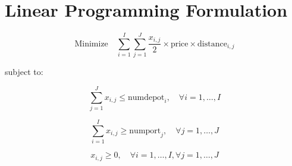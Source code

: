\documentclass{article}
\begin{document}
\section*{Linear Programming Formulation}

\[
\text{Minimize} \quad \sum_{i=1}^I \sum_{j=1}^J \frac{x_{i, j}}{2} \times \text{price} \times \text{distance}_{i, j}
\]

subject to:

\[
\sum_{j=1}^J x_{i, j} \leq \text{numdepot}_i, \quad \forall i = 1, \ldots, I
\]

\[
\sum_{i=1}^I x_{i, j} \geq \text{numport}_j, \quad \forall j = 1, \ldots, J
\]

\[
x_{i, j} \geq 0, \quad \forall i = 1, \ldots, I, \forall j = 1, \ldots, J
\]
\end{document}
